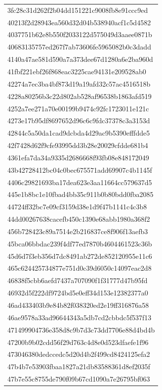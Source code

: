 \begin{tabular}{l}
3fc28c31d262f2b04dd151221c9008fb8e91ccc9ed \\
40213f2d28943ea560d32d04b538940acf1c5d4582 \\
4037751b62e8b550f2033122d575049d3aaee0871b \\
40683135757ed267f7ab73606fe5965082b0c3dadd \\
4140a47ae581d590a7a373dee67d1280a6e2ba960d \\
41fbf221ebf26f868eac3225cae94131e209528ab0 \\
42274a7ec3ba4bf873d19a19afd32c57ac4516518b \\
4228a80256b3c22d802ab528af96538b1863afd519 \\
4252a7ee271a70e00199b9474c92fc1723011e121c \\
4273e17b95df8697652d96c6c9fdc37378c3a3153d \\
42844c5a50da1cad9dcbda4d29ac9b5390efffdde5 \\
42f7428d62f9cfe93995dd3b28e20029cfdde681b4 \\
4361efa7da34a9335d2686668f93fb08e848172049 \\
43b42728412bc04c0bec675571add69907c4b1145f \\
4406c29821693ba17dea623e3aa11664cc579637d5 \\
445e1b8bc1e10fbad4bb35c911b0b80bdd0fba2085 \\
44724ff32bc7e09cf3159d38e1d9f47b1141c4c3b8 \\
44dd00267638cacefb450c1390e68abb1980a368f2 \\
456b728423c89a7514e2b216837ce8f906f13aefb3 \\
45bca06bbdac239f4df77ed7870b4604461523c36b \\
45d6d7f3eb356d7dc8491ab272de852120955e11c6 \\
465c624425734877e751d0c39d6050c14097eac2d8 \\
46838f5cbb6aefd7437a707090f1f31777d47b95fd \\
46932d5f222df9724bd5e0eff34d153e12382377a0 \\
46ad433403b9e84b82f038320ed2e19ff316876a58 \\
46ae9578a33ad96644343a5db7cd2cbbdc5f537f13 \\
471499904736e358d8c9b7d3c73dd7706e88d4bd4b \\
47200b9b02cdd56f29d763c4d8e0d523dfaefe1f96 \\
473046380dedccedc5d20d4b2f499cd8424125efa2 \\
47b4b7e53903fbaa1827a21db83588361d8ef2035f \\
47b7e55c8755de790f09b67cd1090a7e26795bf063 \\

\end{tabular}
